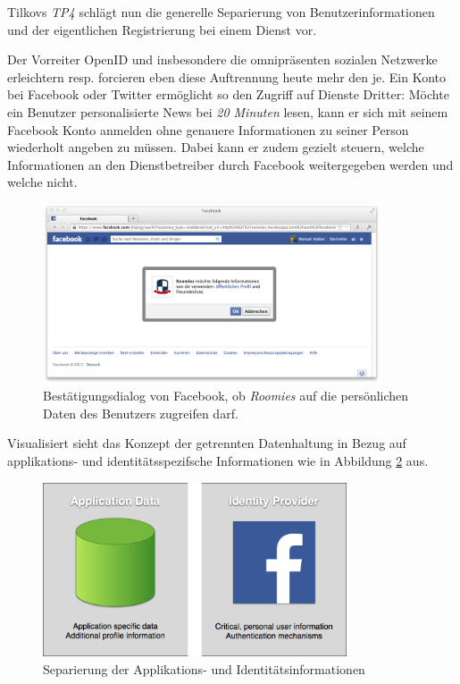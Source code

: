 Tilkovs \emph{TP4} schlägt nun die generelle Separierung von Benutzerinformationen und der eigentlichen Registrierung bei einem Dienst vor.

Der Vorreiter OpenID \cite{OpenID} und insbesondere die omnipräsenten sozialen Netzwerke erleichtern resp. forcieren eben diese Auftrennung heute mehr den je.
\newline\newline
Ein Konto bei Facebook oder Twitter ermöglicht so den Zugriff auf Dienste Dritter: Möchte ein Benutzer personalisierte News bei \emph{20 Minuten} lesen, kann er sich mit seinem Facebook Konto anmelden \cite{20min} ohne genauere Informationen zu seiner Person wiederholt angeben zu müssen. Dabei kann er zudem gezielt steuern, welche Informationen an den Dienstbetreiber durch Facebook weitergegeben werden und welche nicht.

\begin{figure}[H]
	\centering
	\includegraphics[width=10cm]{content/principle-demonstration/images/facebook-auth-dialog.png}
	\caption{Bestätigungsdialog von Facebook, ob \emph{Roomies} auf die persönlichen Daten des Benutzers zugreifen darf.}
	\label{fig:facebook-auth-dialog}
\end{figure}


Visualisiert sieht das Konzept der getrennten Datenhaltung in Bezug auf applikations- und identitätsspezifsche Informationen wie in Abbildung \ref{fig:applicationdata-vs-identityprovider} aus.

\begin{figure}[H]
	\centering
	\includegraphics[width=9cm]{content/principle-demonstration/images/applicationdata-vs-identityprovider.png}
	\caption{Separierung der Applikations- und Identitätsinformationen}
	\label{fig:applicationdata-vs-identityprovider}
\end{figure}

